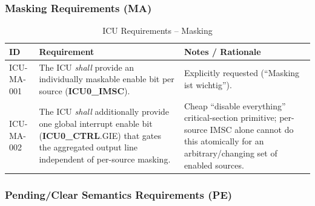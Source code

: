 \subsubsection{Masking Requirements (MA)}

\begin{table}[H]
\caption{ICU Requirements -- Masking}
\label{tab:asIcuReqMA}
\centering
\begin{tabularx}{\textwidth}{|l |X |X|}
  \hline
  ID & Requirement & Notes / Rationale \\
  \hline
  \hline
  ICU-MA-001 &
    The ICU \textit{shall} provide an individually maskable enable bit per
    source (\textbf{ICU0\_IMSC}). &
    Explicitly requested (``Masking ist wichtig''). \\
  \hline
  ICU-MA-002 &
    The ICU \textit{shall} additionally provide one global interrupt
    enable bit (\textbf{ICU0\_CTRL}.GIE) that gates the aggregated output
    line independent of per-source masking. &
    Cheap ``disable everything'' critical-section primitive; per-source
    IMSC alone cannot do this atomically for an arbitrary/changing set of
    enabled sources. \\
  \hline
\end{tabularx}
\end{table}

\subsubsection{Pending/Clear Semantics Requirements (PE)}

